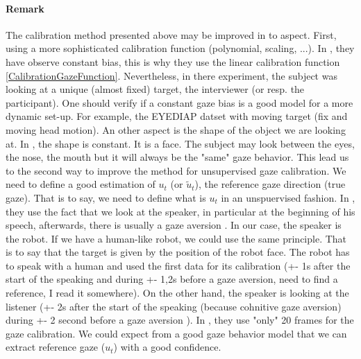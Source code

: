 \documentclass[11pt,a4paper]{article}
\begin{document}
\paragraph{Remark}
The calibration method presented above may be improved in to aspect. First, using a more sophisticated calibration function (polynomial, scaling, ...). In \cite{Siegfried2017}, they have observe constant bias, this is why they use the linear calibration function \eqref{CalibrationGazeFunction}. Nevertheless, in there experiment, the subject was looking at a unique (almost fixed) target, the interviewer (or resp. the participant). One should verify if a constant gaze bias is a good model for a more dynamic set-up. For example, the EYEDIAP datset with moving target (fix and moving head motion). An other aspect is the shape of the object we are looking at. In \cite{Siegfried2017}, the shape is constant. It is a face. The subject may look between the eyes, the nose, the mouth but it will always be the "same" gaze behavior. This lead us to the second way to improve the method for unsupervised gaze calibration. We need to define a good estimation of $u_t$ (or $\tilde{u}_t$), the reference gaze direction (true gaze). That is to say, we need to define what is $u_t$ in an unspuervised fashion. In \cite{Siegfried2017}, they use the fact that we look at the speaker, in particular at the beginning of his speech, afterwards, there is usually a gaze aversion \cite{Admoni2017,Vertegaal2002,Andrist2015}. In our case, the speaker is the robot. If we have a human-like robot, we could use the same principle. That is to say that the target is given by the position of the robot face. The robot has to speak with a human and used the first data for its calibration (+- 1s after the start of the speaking \cite{Land2009} and during +- 1,2s before a gaze aversion, need to find a reference, I read it somewhere). On the other hand, the speaker is looking at the listener (+- 2s after the start of the speaking (because cohnitive gaze aversion) during +- 2 second before a gaze aversion \cite{Andrist2014}). In \cite{Siegfried2017}, they use "only" 20 frames for the gaze calibration. We could expect from a good gaze behavior model that we can extract reference gaze ($u_t$) with a good confidence. 
\end{document}
